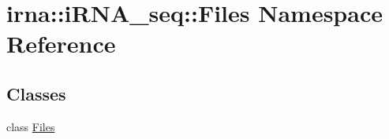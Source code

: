 \hypertarget{namespaceirna_1_1iRNA__seq_1_1Files}{
\section{irna\-:\-:i\-R\-N\-A\-\_\-seq\-:\-:\-Files \-Namespace \-Reference}
\label{namespaceirna_1_1iRNA__seq_1_1Files}
}
\subsection*{\-Classes}
\begin{DoxyCompactItemize}
\item 
class \hyperlink{classirna_1_1iRNA__seq_1_1Files_1_1Files}{\-Files}
\end{DoxyCompactItemize}
